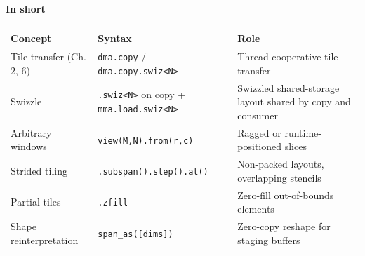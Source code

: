 \paragraph*{In short}

\begin{table}[htbp]
\centering\small
\begin{tabularx}{\linewidth}{@{}lXX@{}}
\toprule
\textbf{Concept} & \textbf{Syntax} & \textbf{Role} \\
\midrule
Tile transfer (Ch. 2, 6) & \texttt{dma.copy} / \texttt{dma.\allowbreak{}copy.\allowbreak{}swiz\textless{}N\textgreater{}} & Thread-cooperative tile transfer \\
Swizzle & \texttt{.\allowbreak{}swiz\textless{}N\textgreater{}} on copy + \texttt{mma.\allowbreak{}load.\allowbreak{}swiz\textless{}N\textgreater{}} & Swizzled shared-storage layout shared by copy and consumer \\
Arbitrary windows & \texttt{view(M,N).\allowbreak{}from(r,c)} & Ragged or runtime-positioned slices \\
Strided tiling & \texttt{.\allowbreak{}subspan().\allowbreak{}step().\allowbreak{}at()} & Non-packed layouts, overlapping stencils \\
Partial tiles & \texttt{.zfill} & Zero-fill out-of-bounds elements \\
Shape reinterpretation & \texttt{span\_\allowbreak{}as([dims])} & Zero-copy reshape for staging buffers \\
\bottomrule
\end{tabularx}
\end{table}
